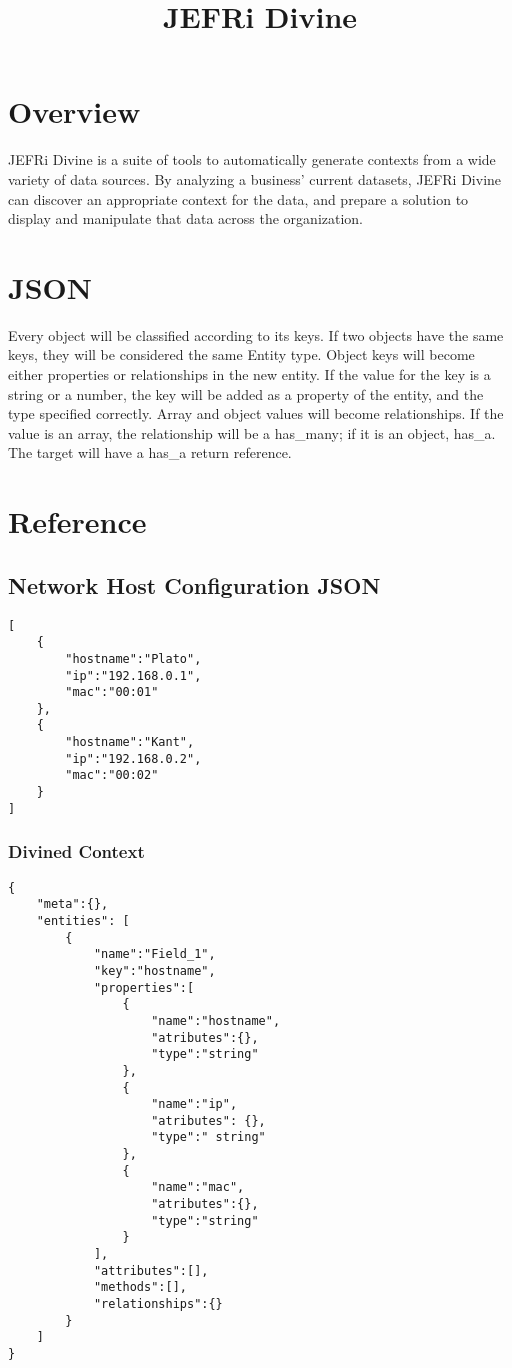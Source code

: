 \documentclass{article}
\begin{document}
\title{JEFRi Divine}
\maketitle
\tableofcontents
\newpage
\linespread{1.6}

\section{Overview}

JEFRi Divine is a suite of tools to automatically generate contexts from a
wide variety of data sources. By analyzing a business' current datasets, JEFRi
Divine can discover an appropriate context for the data, and prepare a
solution to display and manipulate that data across the organization.

\section{JSON}

Every object will be classified according to its keys. If two objects have the
same keys, they will be considered the same Entity type. Object keys will
become either properties or relationships in the new entity. If the value for
the key is a string or a number, the key will be added as a property of the
entity, and the type specified correctly. Array and object values will become
relationships. If the value is an array, the relationship will be a {\ilcode
has\_many}; if it is an object, {\ilcode has\_a}. The target will have a
{\ilcode has\_a} return reference.

\section{Reference}

\subsection{Network Host Configuration JSON}
\begin{lstlisting}
[
	{
		"hostname":"Plato",
		"ip":"192.168.0.1",
		"mac":"00:01"
	},
	{
		"hostname":"Kant",
		"ip":"192.168.0.2",
		"mac":"00:02"
	}
]
\end{lstlisting}

\subsubsection{Divined Context}
\begin{lstlisting}
{
	"meta":{},
	"entities": [
		{
			"name":"Field_1",
			"key":"hostname",
			"properties":[
				{
					"name":"hostname",
					"atributes":{},
					"type":"string"
				},
				{
					"name":"ip",
					"atributes": {},
					"type":" string"
				},
				{
					"name":"mac",
					"atributes":{},
					"type":"string"
				}
			],
			"attributes":[],
			"methods":[],
			"relationships":{}
		}
	]
}
\end{lstlisting}
\end{document}
